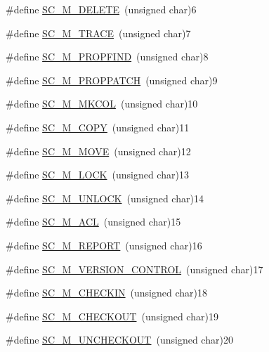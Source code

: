 \begin{DoxyCompactItemize}
\item 
\#define \hyperlink{group__AJP__defines_gac7ded7adfd3199d8f15305fa49c03438}{S\+C\+\_\+\+M\+\_\+\+D\+E\+L\+E\+TE}~(unsigned char)6
\item 
\#define \hyperlink{group__AJP__defines_ga679a5185365cea4afb73877d25901be6}{S\+C\+\_\+\+M\+\_\+\+T\+R\+A\+CE}~(unsigned char)7
\item 
\#define \hyperlink{group__AJP__defines_ga92641a93ab36bd689201dba28686efc2}{S\+C\+\_\+\+M\+\_\+\+P\+R\+O\+P\+F\+I\+ND}~(unsigned char)8
\item 
\#define \hyperlink{group__AJP__defines_ga52fcafc7fa8b3beb24cedfd0c8d1e767}{S\+C\+\_\+\+M\+\_\+\+P\+R\+O\+P\+P\+A\+T\+CH}~(unsigned char)9
\item 
\#define \hyperlink{group__AJP__defines_gad617ddd8f211fbe8338a5e2b223171f7}{S\+C\+\_\+\+M\+\_\+\+M\+K\+C\+OL}~(unsigned char)10
\item 
\#define \hyperlink{group__AJP__defines_ga77b3fd7bc6b7ab8b29b0a95dec8d46fe}{S\+C\+\_\+\+M\+\_\+\+C\+O\+PY}~(unsigned char)11
\item 
\#define \hyperlink{group__AJP__defines_gaed1ff5208589251f75cbcd815a1c3c36}{S\+C\+\_\+\+M\+\_\+\+M\+O\+VE}~(unsigned char)12
\item 
\#define \hyperlink{group__AJP__defines_ga637d3be8acbd2a07a7ce9e053635fe0f}{S\+C\+\_\+\+M\+\_\+\+L\+O\+CK}~(unsigned char)13
\item 
\#define \hyperlink{group__AJP__defines_ga30855864a38f121e11f41d185be94397}{S\+C\+\_\+\+M\+\_\+\+U\+N\+L\+O\+CK}~(unsigned char)14
\item 
\#define \hyperlink{group__AJP__defines_ga4c11040464ee18adbe1a3ccbe3018ad4}{S\+C\+\_\+\+M\+\_\+\+A\+CL}~(unsigned char)15
\item 
\#define \hyperlink{group__AJP__defines_ga38500c518b10b7e0c53293a4dee29ec4}{S\+C\+\_\+\+M\+\_\+\+R\+E\+P\+O\+RT}~(unsigned char)16
\item 
\#define \hyperlink{group__AJP__defines_gab07ff316ff54ae19e4972c5bf5003d89}{S\+C\+\_\+\+M\+\_\+\+V\+E\+R\+S\+I\+O\+N\+\_\+\+C\+O\+N\+T\+R\+OL}~(unsigned char)17
\item 
\#define \hyperlink{group__AJP__defines_ga0263600b6a049a8135192fe8ec4e6683}{S\+C\+\_\+\+M\+\_\+\+C\+H\+E\+C\+K\+IN}~(unsigned char)18
\item 
\#define \hyperlink{group__AJP__defines_gac1b2910c14c43a4e9ffebdfe6adee446}{S\+C\+\_\+\+M\+\_\+\+C\+H\+E\+C\+K\+O\+UT}~(unsigned char)19
\item 
\#define \hyperlink{group__AJP__defines_ga638f097bc3e7f3eeec1c954e5421381a}{S\+C\+\_\+\+M\+\_\+\+U\+N\+C\+H\+E\+C\+K\+O\+UT}~(unsigned char)20

\end{DoxyCompactItemize}
